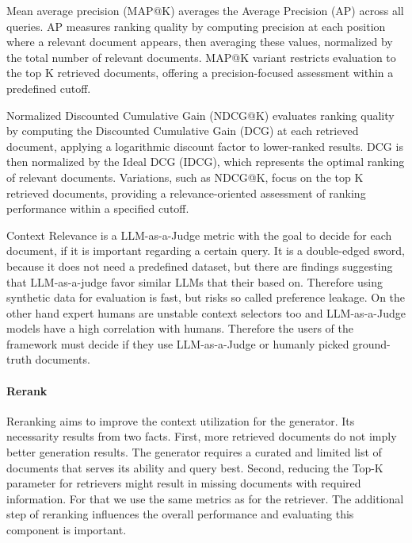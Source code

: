 Mean average precision (MAP@K) averages the Average Precision (AP) across all queries. AP measures ranking quality by computing precision at each position where a relevant document appears, then averaging these values, normalized by the total number of relevant documents. MAP@K variant restricts evaluation to the top K retrieved documents, offering a precision-focused assessment within a predefined cutoff.\cite{EvidentlyAIInc..25.02.2025} 

Normalized Discounted Cumulative Gain (NDCG@K) evaluates ranking quality by computing the Discounted Cumulative Gain (DCG) at each retrieved document, applying a logarithmic discount factor to lower-ranked results. DCG is then normalized by the Ideal DCG (IDCG), which represents the optimal ranking of relevant documents. Variations, such as NDCG@K, focus on the top K retrieved documents, providing a relevance-oriented assessment of ranking performance within a specified cutoff.\cite{Lin.13.10.2020}

Context Relevance is a LLM-as-a-Judge metric with the goal to decide for each document, if it is important regarding a certain query. It is a double-edged sword, because it does not need a predefined dataset, but there are findings suggesting that LLM-as-a-judge favor similar LLMs that their based on. Therefore using synthetic data for evaluation is fast, but risks so called preference leakage.\cite{Li.03.02.2025} On the other hand expert humans are unstable context selectors too and LLM-as-a-Judge models have a high correlation with humans.\cite{Chiang.2023} Therefore the users of the framework must decide if they use LLM-as-a-Judge or humanly picked ground-truth documents.


\paragraph{Rerank}

Reranking aims to improve the context utilization for the generator. Its necessarity results from two facts. First, more retrieved documents do not imply better generation results.\cite{Jin.08.10.2024} The generator requires a curated and limited list of documents that serves its ability and query best. Second, reducing the Top-K parameter for retrievers might result in missing documents with required information. For that we use the same metrics as for the retriever. The additional step of reranking influences the overall performance and evaluating this component is important. 


